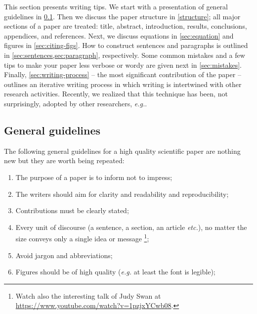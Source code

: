 \documentclass[authoryear,12pta4paper,fleqn]{article}
\makeatletter
\newcommand{\eg}{\textit{e.g.}\xspace}
\newcommand{\etc}{\textit{etc.}\@\xspace}
\numberwithin{equation}{section}
\theoremstyle{remark}
\makeatother
\begin{document}
This section presents  writing tips. We start with a presentation of general guidelines in \cref{sec:guidelines}. Then we  discuss the paper structure in \cref{structure};  all major sections of a paper are treated: title, abstract, introduction, results, conclusions, appendices, and references. Next, we discuss equations in
\cref{sec:equation} and figures in \cref{sec:citing-figs}. How to construct sentences and paragraphs is outlined in \cref{sec:sentences,sec:paragraph}, respectively.
Some common mistakes and a few tips to make your paper less verbose or wordy are given next in 
\cref{sec:mistakes}.  Finally, \cref{sec:writing-process} -- the most significant contribution of the paper -- outlines an iterative writing process in which writing is intertwined with other research activities. Recently, we realized that this technique has been, not surprisingly, adopted by other researchers, \eg \cite{Jones}.

\subsection{General guidelines}\label{sec:guidelines}

The following general guidelines for a high quality scientific paper are nothing new but they are worth being repeated:

\begin{enumerate}
\item The purpose of a paper is to inform not to impress;
\item The writers should aim for clarity and readability and  reproducibility;
\item Contributions must be clearly stated;
\item Every unit of discourse (a sentence, a section, an article \etc), no matter the size conveys only a single idea or message \citep{gopen1990science,McCarthy}\footnote{Watch also the interesting talk of Judy Swan at \url{https://www.youtube.com/watch?v=1pzjxYCwb08}.};
\item Avoid jargon and abbreviations;%
\item Figures should be of high quality (\eg at least the font is legible);
\end{enumerate}
\end{document}
